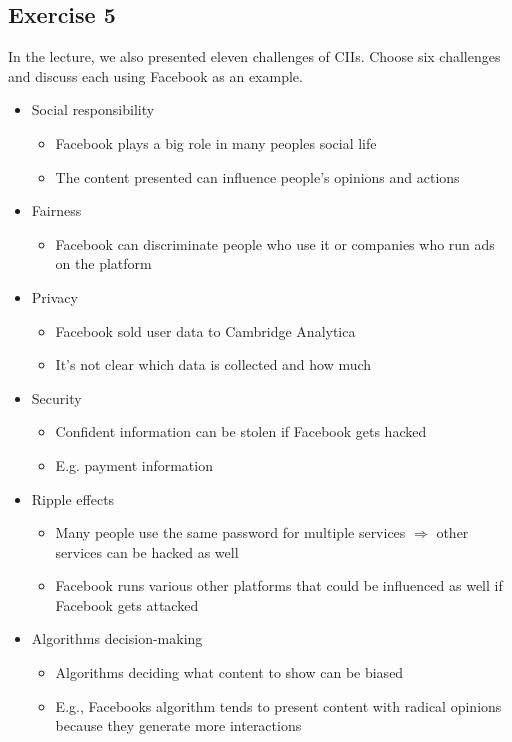 \documentclass{article}
\begin{document}
\subsection{Exercise 5}
In the lecture, we also presented eleven challenges of CIIs. Choose six challenges and discuss each using Facebook as an example.
\begin{itemize}
    \item Social responsibility
          \begin{itemize}
              \item Facebook plays a big role in many peoples social life
              \item The content presented can influence people's opinions and actions
          \end{itemize}
    \item Fairness
          \begin{itemize}
              \item Facebook can discriminate people who use it or companies who run ads on the platform
          \end{itemize}
    \item Privacy
          \begin{itemize}
              \item Facebook sold user data to Cambridge Analytica
              \item It's not clear which data is collected and how much
          \end{itemize}
    \item Security
          \begin{itemize}
              \item Confident information can be stolen if Facebook gets hacked
              \item E.g. payment information
          \end{itemize}
    \item Ripple effects
          \begin{itemize}
              \item Many people use the same password for multiple services \(\Rightarrow\) other services can be hacked as well
              \item Facebook runs various other platforms that could be influenced as well if Facebook gets attacked
          \end{itemize}
    \item Algorithms decision-making
          \begin{itemize}
              \item Algorithms deciding what content to show can be biased
              \item E.g., Facebooks algorithm tends to present content with radical opinions because they generate more interactions
          \end{itemize}
\end{itemize}
\end{document}
